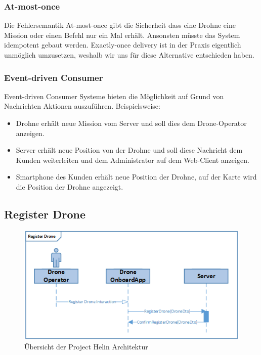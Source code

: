 \subsubsection{At-most-once}

Die Fehlersemantik At-most-once gibt die Sicherheit dass eine Drohne eine Mission oder einen Befehl nur ein Mal erhält. Ansonsten müsste das System idempotent gebaut werden. Exactly-once delivery ist in der Praxis eigentlich unmöglich umzusetzen, weshalb wir uns für diese Alternative entschieden haben. 
%
\subsubsection{Event-driven Consumer}
{Event-driven Consumer \cite[S. 442]{EIP}} Systeme bieten die Möglichkeit auf Grund von Nachrichten Aktionen auszuführen. Beispielsweise:
%
\begin{itemize}
	\item Drohne erhält neue Mission vom Server und soll dies dem Drone-Operator anzeigen.
	\item Server erhält neue Position von der Drohne und soll diese Nachricht dem Kunden weiterleiten und dem Administrator auf dem Web-Client anzeigen.
	\item Smartphone des Kunden erhält neue Position der Drohne, auf der Karte wird die Position der Drohne angezeigt.
\end{itemize}


\subsection{Register Drone}
\begin{figure}[h]
	\centering
	\includegraphics[scale=1.0]{images/registerDrone.png}
	\caption{Übersicht der Project Helin Architektur }
	\label{fig:registerDrone}
\end{figure}
%
